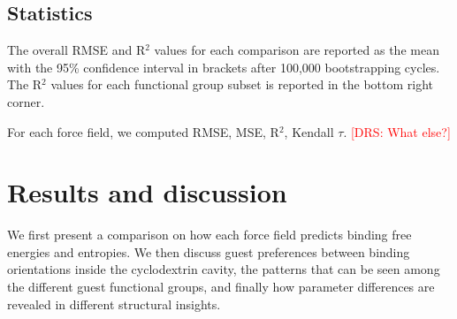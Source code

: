 \documentclass[9pt,lineno]{elife}
\newcommand{\drsnote}[1]{ {\textcolor{red} { [DRS: #1] }}}
\newcommand{\drsnote}[1]{}
\begin{document}

\subsection{Statistics}
The overall RMSE and R$^2$ values for each comparison are reported as the mean with the 95\% confidence interval in brackets after 100,000 bootstrapping cycles. The R$^2$ values for each functional group subset is reported in the bottom right corner.

For each force field, we computed RMSE, MSE, R$^2$, Kendall $\tau$. \drsnote{What else?}

\section{Results and discussion}
We first present a comparison on how each force field predicts binding free energies and entropies. We then discuss guest preferences between binding orientations inside the cyclodextrin cavity, the patterns that can be seen among the different guest functional groups, and finally how parameter differences are revealed in different structural insights.
\end{document}
